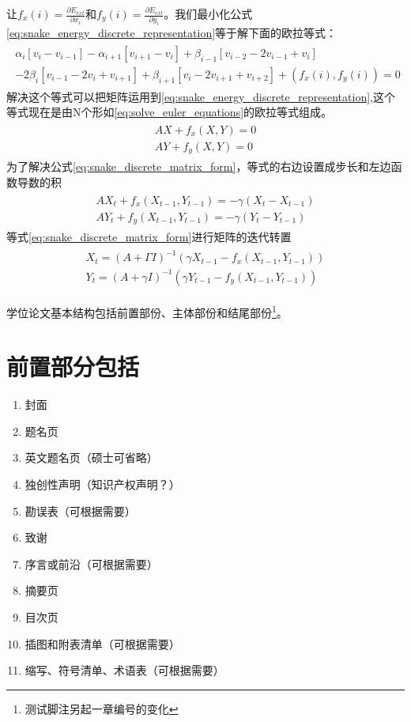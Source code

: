 让$f_{x}(i)=\frac{\partial E_{ext}}{\partial x_{i}}$和$f_{y}(i)=\frac{\partial
E_{ext}}{\partial
y_{i}}$。我们最小化公式\eqref{eq:snake_energy_discrete_representation}等于解下面的欧拉等式：
\begin{align}\label{eq:solve_euler_equations}
\begin{split}
\alpha_{i}[v_{i}-v_{i-1}] - \alpha_{i+1}[v_{i+1} -v_{i}]
+\beta_{i-1}[v_{i-2}-2v_{i-1}+v_{i}]\\
-2\beta_{i}[v_{i-1}-2v_{i}+v_{i+1}]+\beta_{i+1}[v_{i}-2v_{i+1}+v_{i+2}]+(f_{x}(i),f_{y}(i))=0
\end{split}
\end{align}
解决这个等式可以把矩阵运用到\eqref{eq:snake_energy_discrete_representation},这个等式现在是由N个形如\eqref{eq:solve_euler_equations}的欧拉等式组成。
\begin{align}\label{eq:snake_discrete_matrix_form}
\begin{split}
AX+f_{x}(X,Y)=0\\
AY+f_{y}(X,Y)=0
\end{split}
\end{align}
为了解决公式\eqref{eq:snake_discrete_matrix_form}，等式的右边设置成步长和左边函数导数的积
\begin{align}\label{eq:snake_discrete_matrix_form_solve}
\begin{split}
AX_{t}+f_{x}(X_{t-1},Y_{t-1})=-\gamma(X_{t}-X_{t-1})   \\
AY_{t}+f_{y}(X_{t-1},Y_{t-1})=-\gamma(Y_{t}-Y_{t-1})
\end{split}
\end{align}
等式\eqref{eq:snake_discrete_matrix_form}进行矩阵的迭代转置
\begin{align}\label{eq:snake_discrete_matrix_form_solve}
\begin{split}
X_{t}=(A+\Gamma I)^{-1}(\gamma X_{t-1} - f_{x}(X_{t-1},Y_{t-1}))\\
Y_{t}=(A+\gamma I)^{-1}(\gamma Y_{t-1} - f_{y}(X_{t-1},Y_{t-1}))
\end{split}
\end{align}


学位论文基本结构包括前置部份、主体部份和结尾部份\footnote{测试脚注另起一章编号的变化}。
\section{前置部分包括}
\begin{enumerate}
	\item 封面
	\item 题名页
	\item 英文题名页（硕士可省略）
	\item 独创性声明（知识产权声明？）
	\item 勘误表（可根据需要）
	\item 致谢
	\item 序言或前沿（可根据需要）
	\item 摘要页
	\item 目次页
	\item 插图和附表清单（可根据需要）
	\item 缩写、符号清单、术语表（可根据需要）
\end{enumerate}
